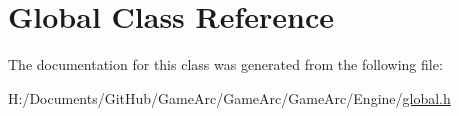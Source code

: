 \hypertarget{class_global}{\section{Global Class Reference}
\label{class_global}
}


The documentation for this class was generated from the following file\+:\begin{DoxyCompactItemize}
\item 
H\+:/\+Documents/\+Git\+Hub/\+Game\+Arc/\+Game\+Arc/\+Game\+Arc/\+Engine/\hyperlink{global_8h}{global.\+h}\end{DoxyCompactItemize}

